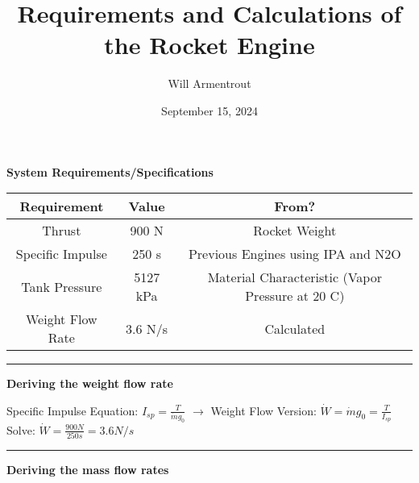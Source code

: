 \documentclass[12pt, letter paper]{article}
\title{Requirements and Calculations of the Rocket Engine}
\author{Will Armentrout}
\date{September 15, 2024}
\begin{document}
	\maketitle
	
	\begin{center}
		\textbf{System Requirements/Specifications}\\
		\begin{tabular}{|c |c |c |}
			\hline
			\textbf{Requirement} & \textbf{Value} & \textbf{From?} \\ \hline
			Thrust & 900 N & Rocket Weight \\ \hline
			Specific Impulse & 250 s & Previous Engines using IPA and N2O \\ \hline
			Tank Pressure & 5127 kPa & Material Characteristic (Vapor Pressure at 20 C) \\ \hline
			Weight Flow Rate & 3.6 N/s & Calculated \\ \hline
			
			
		\end{tabular}
	\end{center}
	\noindent\rule{\linewidth}{0.4pt}
	\begin{center}
		\textbf{Deriving the weight flow rate} \\
	\end{center}
	Specific Impulse Equation:  $I_{sp} = \frac{T}{\dot{m} g_0} $ 
	$\rightarrow$
	Weight Flow Version: $ \dot{W} = \dot{m} g_0= \frac{T}{I_{sp}}$ \\
	Solve: $ \dot{W} = \frac{900 N}{250 s} = 3.6 N/s $
	
	\noindent\rule{\linewidth}{0.4pt}
	\begin{center}
		\textbf{Deriving the mass flow rates} \\
	\end{center}
\end{document}
